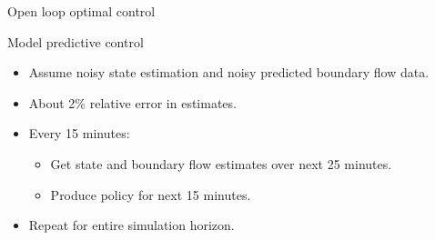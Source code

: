 \begin{frame}{Open loop optimal control}

\begin{figure}
\hfill{}
\end{figure}

\end{frame}

\begin{frame}{Model predictive control}

\begin{itemize}
	\item Assume noisy state estimation and noisy predicted boundary flow data.
	\item About 2\% relative error in estimates.
	\item Every 15 minutes:
	\begin{itemize}
		\item Get state and boundary flow estimates over next 25 minutes.
		\item Produce policy for next 15 minutes.
	\end{itemize}
	\item Repeat for entire simulation horizon.
\end{itemize}
\end{frame}


